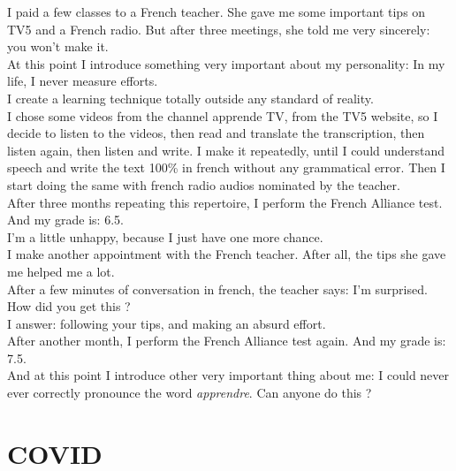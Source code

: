 \documentclass[11pt]{book}
\begin{document}
\noindent I paid a few classes to a French teacher. She gave me some important tips on TV5 and a French radio. But after three meetings, she told me very sincerely: you won't make it. \\

\noindent At this point I introduce something very important about my personality: In my life, I never measure efforts. \\

\noindent I create a learning technique totally outside any standard of reality. \\

\noindent I chose some videos from the channel apprende TV, from the TV5 website, so I decide to listen to the videos, then read and translate the transcription, then listen again, then listen and write. I make it repeatedly, until I could understand speech and write the  text 100\% in french without any grammatical error. Then I start doing the same with french radio audios nominated by the teacher. \\

\noindent After three months repeating this repertoire, I perform the French Alliance test. And my grade is: 6.5. \\

\noindent I'm a little unhappy, because I just have one more chance.  \\

\noindent I make another appointment with the French teacher. After all, the tips she gave me helped me a lot. \\

\noindent After a few minutes of conversation in french, the teacher says: I'm surprised. How did you get this ? \\

\noindent I answer: following your tips, and making an absurd effort. \\

\noindent After another month, I perform the French Alliance test again. And my grade is: 7.5. \\

\noindent And at this point I introduce other very important thing about me: I could never ever correctly pronounce the word \emph{apprendre}. Can anyone do this ?

\chapter{COVID}
\end{document}
